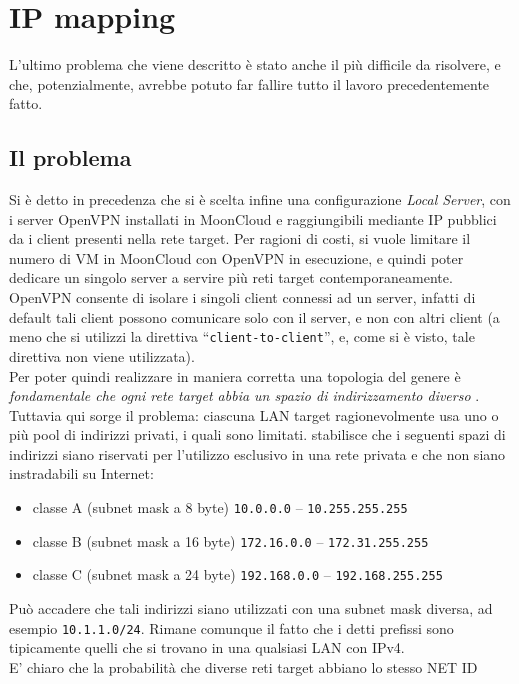 \section{IP mapping}
L'ultimo problema che viene descritto  è stato anche il
più difficile da risolvere, e che, potenzialmente, avrebbe potuto far fallire
tutto il lavoro precedentemente fatto.

\subsection{Il problema}
Si è detto in precedenza che si è scelta infine una configurazione \textit{Local
Server}, con i server OpenVPN installati in MoonCloud e raggiungibili mediante IP
pubblici da i client presenti nella rete target. Per ragioni di costi, si vuole
limitare il numero di VM in MoonCloud con OpenVPN in esecuzione, e quindi poter
dedicare un singolo server a servire più reti target contemporaneamente. OpenVPN
consente di isolare i singoli client connessi ad un server, infatti di default
tali client possono comunicare solo con il server, e non con altri client (a meno
che si utilizzi la direttiva ``\texttt{client-to-client}'', e, come si è visto,
tale direttiva non viene utilizzata).\\
Per poter quindi realizzare in maniera corretta una topologia del genere è
\textit{fondamentale che ogni rete target abbia un spazio di indirizzamento diverso} \cite{openvpn-lan-to-lan}.
Tuttavia qui sorge il problema: ciascuna LAN target ragionevolmente usa uno o più
pool di indirizzi privati, i quali sono limitati. \cite{RFC1918}
stabilisce che i seguenti spazi di indirizzi siano riservati per l'utilizzo esclusivo
in una rete privata e che non siano instradabili su Internet:
\begin{itemize}
  \item classe A (subnet mask a 8 byte) \texttt{10.0.0.0} -- \texttt{10.255.255.255}
  \item classe B (subnet mask a 16 byte) \texttt{172.16.0.0} -- \texttt{172.31.255.255}
  \item classe C (subnet mask a 24 byte) \texttt{192.168.0.0} -- \texttt{192.168.255.255}
\end{itemize}
Può accadere che tali indirizzi siano utilizzati con una subnet mask diversa, ad esempio
\texttt{10.1.1.0/24}. Rimane
comunque il fatto che i detti prefissi sono tipicamente quelli che si trovano
in una qualsiasi LAN con IPv4.\\
E' chiaro che la probabilità che diverse reti target abbiano lo stesso NET ID

